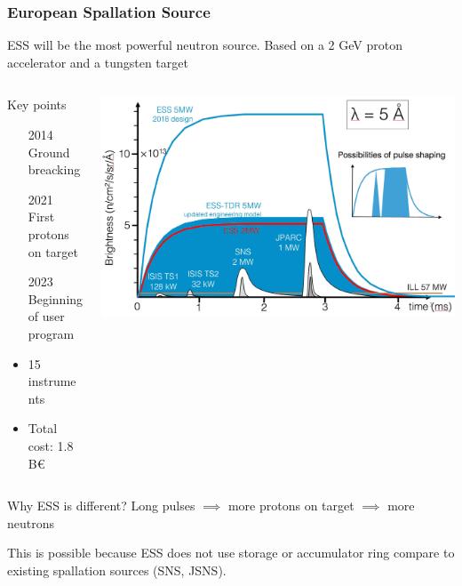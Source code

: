 \begin{frame}
  \frametitle{European Spallation Source}
    ESS will be the most powerful neutron source.
    Based on a 2 GeV proton accelerator and a tungsten target
  \begin{columns}
    \begin{column}{0.35\textwidth}
      \begin{block}{Key points}
        \begin{itemize}
          \item[2014] Ground breacking
          \item[2021] First protons on target
          \item[2023] Beginning of user program
          \item 15 instruments
          \item Total cost: 1.8 B€
        \end{itemize}
      \end{block}
    \end{column}
    \begin{column}{0.60\textwidth}
      \includegraphics[width=\textwidth]{01_Neutron/fig/fig000_ESS_pulse2.jpeg}
    \end{column}
  \end{columns}
  \begin{block}{Why ESS is different?}
    Long pulses $\implies$ more protons on target $\implies$ more neutrons

    This is possible because ESS does not use storage or accumulator ring compare to existing spallation sources (SNS, JSNS).
  \end{block}
\end{frame}

